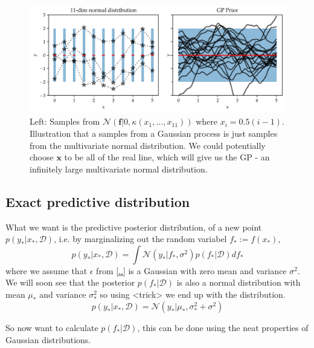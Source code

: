 \begin{figure}[h]
    \centering
    \includegraphics[width = \textwidth]{Pictures/GP_samples_mattern.pdf}
    \caption{Left: Samples from $\mathcal{N}(\textbf{f}|0,\kappa(x_1,\dots, x_{11}))$ where
    $x_i= 0.5(i-1)$. Illustration that a samples from a Gaussian process is just
    samples from the multivariate normal distribution. We could potentially choose
    $\textbf{x}$ to be all of the real line, which will give us the GP - an infinitely
    large multivariate normal distribution.}
    \label{GP_illustration}
\end{figure}

\subsection{Exact predictive distribution}
What we want is the predictive posterior distribution, of a new point $p(y_*|x_*, \mathcal{D})$, i.e. by marginalizing 
out the random variabel $f_* := f(x_*)$, 
\begin{equation}\label{GP_predictive}
    p(y_*|x_*,\mathcal{D}) = \int \mathcal{N}(y_*|f_*, \sigma^2) p(f_*|\mathcal{D})df_*
\end{equation}
where we assume that $\epsilon$ from \ref{..} is a Gaussian with zero mean and variance $\sigma^2$.
We will soon see that the posterior $p(f_*|\mathcal{D})$ is also a normal distribution 
with mean $\mu_*$ and variance $\sigma^2_*$ so
using <trick> we end up with the distribution. 
$$p(y_*|x_*,\mathcal{D}) = \mathcal{N}(y_*|\mu_*,\sigma^2_*+\sigma^2)$$

So now want to calculate $p(f_*|\mathcal{D})$, this can be done using the neat properties of Gaussian
distributions.  
